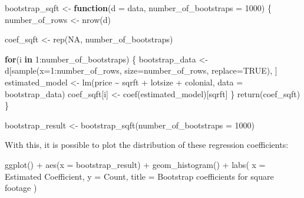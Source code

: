 \documentclass[
]{book}
\newenvironment{Shaded}{\begin{snugshade}}{\end{snugshade}}
\newcommand{\AttributeTok}[1]{\textcolor[rgb]{0.77,0.63,0.00}{#1}}
\newcommand{\ConstantTok}[1]{\textcolor[rgb]{0.00,0.00,0.00}{#1}}
\newcommand{\ControlFlowTok}[1]{\textcolor[rgb]{0.13,0.29,0.53}{\textbf{#1}}}
\newcommand{\DecValTok}[1]{\textcolor[rgb]{0.00,0.00,0.81}{#1}}
\newcommand{\FunctionTok}[1]{\textcolor[rgb]{0.00,0.00,0.00}{#1}}
\newcommand{\NormalTok}[1]{#1}
\newcommand{\OtherTok}[1]{\textcolor[rgb]{0.56,0.35,0.01}{#1}}
\newcommand{\SpecialCharTok}[1]{\textcolor[rgb]{0.00,0.00,0.00}{#1}}
\newcommand{\StringTok}[1]{\textcolor[rgb]{0.31,0.60,0.02}{#1}}
\theoremstyle{definition}
\theoremstyle{definition}
\theoremstyle{definition}
\theoremstyle{definition}
\theoremstyle{remark}
\begin{document}
\begin{Shaded}
\begin{Highlighting}[]
\NormalTok{bootstrap\_sqft }\OtherTok{\textless{}{-}} \ControlFlowTok{function}\NormalTok{(}\AttributeTok{d =}\NormalTok{ data, }\AttributeTok{number\_of\_bootstraps =} \DecValTok{1000}\NormalTok{) \{ }
\NormalTok{  number\_of\_rows }\OtherTok{\textless{}{-}} \FunctionTok{nrow}\NormalTok{(d)}

\NormalTok{    coef\_sqft }\OtherTok{\textless{}{-}} \FunctionTok{rep}\NormalTok{(}\ConstantTok{NA}\NormalTok{, number\_of\_bootstraps)}

    \ControlFlowTok{for}\NormalTok{(i }\ControlFlowTok{in} \DecValTok{1}\SpecialCharTok{:}\NormalTok{number\_of\_bootstraps) \{ }
\NormalTok{      bootstrap\_data }\OtherTok{\textless{}{-}}\NormalTok{ d[}\FunctionTok{sample}\NormalTok{(}\AttributeTok{x=}\DecValTok{1}\SpecialCharTok{:}\NormalTok{number\_of\_rows, }\AttributeTok{size=}\NormalTok{number\_of\_rows, }\AttributeTok{replace=}\ConstantTok{TRUE}\NormalTok{), ]  }
\NormalTok{      estimated\_model }\OtherTok{\textless{}{-}} \FunctionTok{lm}\NormalTok{(price }\SpecialCharTok{\textasciitilde{}}\NormalTok{ sqrft }\SpecialCharTok{+}\NormalTok{ lotsize }\SpecialCharTok{+}\NormalTok{ colonial, }\AttributeTok{data =}\NormalTok{ bootstrap\_data)}
\NormalTok{      coef\_sqft[i]    }\OtherTok{\textless{}{-}} \FunctionTok{coef}\NormalTok{(estimated\_model)[}\StringTok{\textquotesingle{}sqrft\textquotesingle{}}\NormalTok{]}
\NormalTok{    \}}
  \FunctionTok{return}\NormalTok{(coef\_sqft)}
\NormalTok{  \}}
\end{Highlighting}
\end{Shaded}

\begin{Shaded}
\begin{Highlighting}[]
\NormalTok{bootstrap\_result }\OtherTok{\textless{}{-}} \FunctionTok{bootstrap\_sqft}\NormalTok{(}\AttributeTok{number\_of\_bootstraps =} \DecValTok{1000}\NormalTok{)}
\end{Highlighting}
\end{Shaded}

With this, it is possible to plot the distribution of these regression coefficients:

\begin{Shaded}
\begin{Highlighting}[]
\FunctionTok{ggplot}\NormalTok{() }\SpecialCharTok{+} 
  \FunctionTok{aes}\NormalTok{(}\AttributeTok{x =}\NormalTok{ bootstrap\_result) }\SpecialCharTok{+} 
  \FunctionTok{geom\_histogram}\NormalTok{() }\SpecialCharTok{+} 
  \FunctionTok{labs}\NormalTok{(}
    \AttributeTok{x =} \StringTok{\textquotesingle{}Estimated Coefficient\textquotesingle{}}\NormalTok{, }
    \AttributeTok{y =} \StringTok{\textquotesingle{}Count\textquotesingle{}}\NormalTok{, }
    \AttributeTok{title =} \StringTok{\textquotesingle{}Bootstrap coefficients for square footage\textquotesingle{}}
\NormalTok{  )}
\end{Highlighting}
\end{Shaded}
\end{document}
